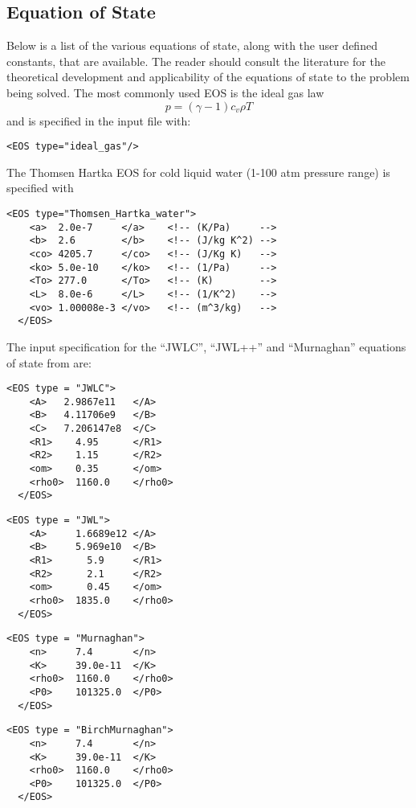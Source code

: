 \subsection{Equation of State}
Below is a list of the various equations of state, along with the user defined constants, that are available.  The reader should consult the literature for the theoretical development and applicability of the equations of state to the problem being solved.
%
%
The most commonly used EOS is the ideal gas law
\begin{equation}
  p = (\gamma -1) c_v \rho T
\end{equation}
%
and is specified in the input file with:
%
\begin{Verbatim}[fontsize=\footnotesize]
<EOS type="ideal_gas"/>
\end{Verbatim}
%
The Thomsen Hartka EOS for cold liquid water (1-100 atm pressure range) is specified with \cite{ref:Thomsen,ref:bejan}
%
\begin{Verbatim}[fontsize=\footnotesize]
  <EOS type="Thomsen_Hartka_water">
    <a>  2.0e-7     </a>    <!-- (K/Pa)     -->    
    <b>  2.6        </b>    <!-- (J/kg K^2) -->
    <co> 4205.7     </co>   <!-- (J/Kg K)   -->
    <ko> 5.0e-10    </ko>   <!-- (1/Pa)     -->
    <To> 277.0      </To>   <!-- (K)        -->
    <L>  8.0e-6     </L>    <!-- (1/K^2)    -->
    <vo> 1.00008e-3 </vo>   <!-- (m^3/kg)   -->
  </EOS>
\end{Verbatim}
% 
%
The input specification for the ``JWLC'', ``JWL++'' and ``Murnaghan'' equations of state from \cite{ref:JWL} are: 
%
\begin{Verbatim}[fontsize=\footnotesize]
  <EOS type = "JWLC">
    <A>   2.9867e11   </A>
    <B>   4.11706e9   </B>
    <C>   7.206147e8  </C>
    <R1>    4.95      </R1>
    <R2>    1.15      </R2>
    <om>    0.35      </om>
    <rho0>  1160.0    </rho0>
  </EOS>
\end{Verbatim}
%
\begin{Verbatim}[fontsize=\footnotesize]
  <EOS type = "JWL">
    <A>     1.6689e12 </A>
    <B>     5.969e10  </B>
    <R1>      5.9     </R1>
    <R2>      2.1     </R2>
    <om>      0.45    </om>
    <rho0>  1835.0    </rho0>
  </EOS>
\end{Verbatim}
%
\begin{Verbatim}[fontsize=\footnotesize]
  <EOS type = "Murnaghan">
    <n>     7.4       </n>
    <K>     39.0e-11  </K>
    <rho0>  1160.0    </rho0>
    <P0>    101325.0  </P0>
  </EOS>
\end{Verbatim}
%
\begin{Verbatim}[fontsize=\footnotesize]
  <EOS type = "BirchMurnaghan">
    <n>     7.4       </n>
    <K>     39.0e-11  </K>
    <rho0>  1160.0    </rho0>
    <P0>    101325.0  </P0>
  </EOS>
\end{Verbatim}

